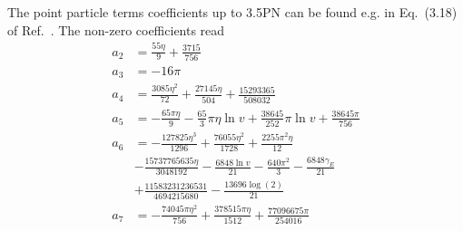 \documentclass[prd,aps,letter,twocolumn,floatfix,notitlepage,nofootinbib]{revtex4-1}
\begin{document}
The point particle terms coefficients up to 3.5PN can be found e.g. in Eq.~(3.18) of Ref.~\cite{BuonannoIyerOchsner2009}. The non-zero coefficients read
\begin{align}
	a_{2} &= \frac{55 \eta }{9}+\frac{3715}{756} \nonumber\\
	a_{3} &= -16 \pi \nonumber\\
	a_{4} &= \frac{3085 \eta ^2}{72}+\frac{27145 \eta }{504}+\frac{15293365}{508032} \nonumber\\
	a_{5} &= -\frac{65 \pi  \eta }{9}-\frac{65}{3} \pi  \eta   \ln v +\frac{38645}{252} \pi   \ln v +\frac{38645 \pi }{756} \nonumber\\
	a_{6} &= -\frac{127825 \eta ^3}{1296}+\frac{76055 \eta ^2}{1728}+\frac{2255 \pi ^2 \eta }{12} \nonumber\\ 
	& -\frac{15737765635 \eta }{3048192}-\frac{6848  \ln v }{21}-\frac{640 \pi ^2}{3}-\frac{6848 \gamma_{E} }{21} \nonumber\\ 
	& +\frac{11583231236531}{4694215680}-\frac{13696 \log (2)}{21} \nonumber\\
	a_{7} &= -\frac{74045 \pi  \eta ^2}{756}+\frac{378515 \pi  \eta }{1512}+\frac{77096675 \pi }{254016}
\end{align}
\end{document}
